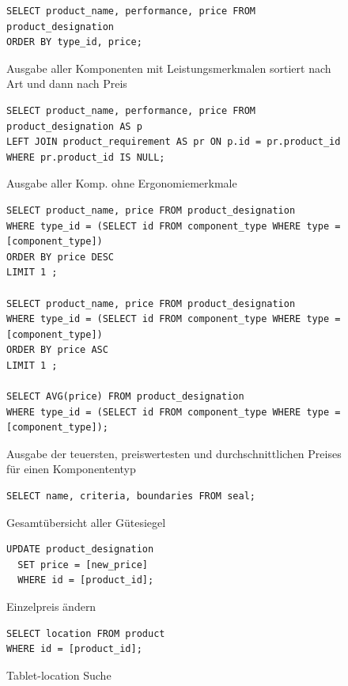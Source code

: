 \documentclass{article}
\begin{document}
\begin{figure}[!h]
\centering
\caption{
Ausgabe aller Komponenten mit Leistungsmerkmalen sortiert nach Art und dann nach Preis
}
\begin{lstlisting}
SELECT product_name, performance, price FROM product_designation
ORDER BY type_id, price;
\end{lstlisting}
\end{figure}
\begin{figure}[!h]
\centering
\caption{Ausgabe aller Komp. ohne Ergonomiemerkmale}
\begin{lstlisting}
SELECT product_name, performance, price FROM product_designation AS p
LEFT JOIN product_requirement AS pr ON p.id = pr.product_id
WHERE pr.product_id IS NULL;
\end{lstlisting}
\end{figure}
\begin{figure}[!h]
\centering
\caption{Ausgabe der teuersten, preiswertesten und durchschnittlichen Preises für einen Komponententyp}
\begin{lstlisting}
SELECT product_name, price FROM product_designation
WHERE type_id = (SELECT id FROM component_type WHERE type = [component_type])
ORDER BY price DESC 
LIMIT 1 ;

SELECT product_name, price FROM product_designation
WHERE type_id = (SELECT id FROM component_type WHERE type = [component_type])
ORDER BY price ASC 
LIMIT 1 ;

SELECT AVG(price) FROM product_designation
WHERE type_id = (SELECT id FROM component_type WHERE type = [component_type]);
\end{lstlisting}
\end{figure}
\begin{figure}[!h]
\centering

\caption{Gesamtübersicht aller Gütesiegel}
\begin{lstlisting}
SELECT name, criteria, boundaries FROM seal;
\end{lstlisting}
\end{figure}
\begin{figure}[!h]
\caption{Einzelpreis ändern}
\begin{lstlisting}
UPDATE product_designation
  SET price = [new_price]
  WHERE id = [product_id];
\end{lstlisting}
\end{figure}
\begin{figure}[!h]
\caption{Tablet-location Suche}
\begin{lstlisting}
SELECT location FROM product
WHERE id = [product_id];
\end{lstlisting}
\end{figure}
\end{document}
